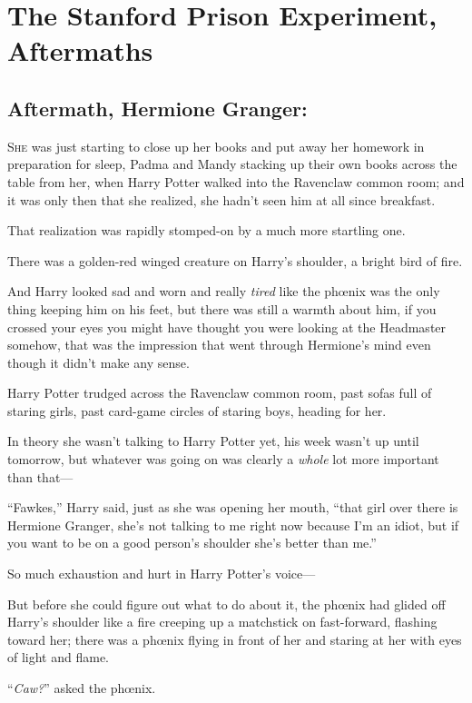 \chapter{The Stanford Prison Experiment, Aftermaths}

\section{Aftermath, Hermione Granger:}

\lettrine{S}{he} was just starting to close up her books and put away her homework in preparation for sleep, Padma and Mandy stacking up their own books across the table from her, when Harry Potter walked into the Ravenclaw common room; and it was only then that she realized, she hadn’t seen him at all since breakfast.

That realization was rapidly stomped-on by a much more startling one.

There was a golden-red winged creature on Harry’s shoulder, a bright bird of fire.

And Harry looked sad and worn and really \emph{tired} like the phœnix was the only thing keeping him on his feet, but there was still a warmth about him, if you crossed your eyes you might have thought you were looking at the Headmaster somehow, that was the impression that went through Hermione’s mind even though it didn’t make any sense.

Harry Potter trudged across the Ravenclaw common room, past sofas full of staring girls, past card-game circles of staring boys, heading for her.

In theory she wasn’t talking to Harry Potter yet, his week wasn’t up until tomorrow, but whatever was going on was clearly a \emph{whole} lot more important than that—

“Fawkes,” Harry said, just as she was opening her mouth, “that girl over there is Hermione Granger, she’s not talking to me right now because I’m an idiot, but if you want to be on a good person’s shoulder she’s better than me.”

So much exhaustion and hurt in Harry Potter’s voice—

But before she could figure out what to do about it, the phœnix had glided off Harry’s shoulder like a fire creeping up a matchstick on fast-forward, flashing toward her; there was a phœnix flying in front of her and staring at her with eyes of light and flame.

“\emph{Caw?}” asked the phœnix.

